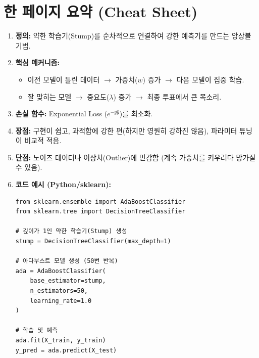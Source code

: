 \documentclass[11pt,a4paper]{book}
\theoremstyle{definition}
\begin{document}
\section{한 페이지 요약 (Cheat Sheet)}

\begin{tcolorbox}[colback=white, colframe=black, title={AdaBoost Quick Review}]
\begin{enumerate}
    \item \textbf{정의:} 약한 학습기(Stump)를 순차적으로 연결하여 강한 예측기를 만드는 앙상블 기법.
    \item \textbf{핵심 메커니즘:}
        \begin{itemize}
            \item 이전 모델이 틀린 데이터 $\rightarrow$ 가중치($w$) 증가 $\rightarrow$ 다음 모델이 집중 학습.
            \item 잘 맞히는 모델 $\rightarrow$ 중요도($\lambda$) 증가 $\rightarrow$ 최종 투표에서 큰 목소리.
        \end{itemize}
    \item \textbf{손실 함수:} Exponential Loss ($e^{-y\hat{y}}$)를 최소화.
    \item \textbf{장점:} 구현이 쉽고, 과적합에 강한 편(하지만 영원히 강하진 않음), 파라미터 튜닝이 비교적 적음.
    \item \textbf{단점:} 노이즈 데이터나 이상치(Outlier)에 민감함 (계속 가중치를 키우려다 망가질 수 있음).
    \item \textbf{코드 예시 (Python/sklearn):}
\begin{lstlisting}[breaklines=true]
from sklearn.ensemble import AdaBoostClassifier
from sklearn.tree import DecisionTreeClassifier

# 깊이가 1인 약한 학습기(Stump) 생성
stump = DecisionTreeClassifier(max_depth=1)

# 아다부스트 모델 생성 (50번 반복)
ada = AdaBoostClassifier(
    base_estimator=stump,
    n_estimators=50,
    learning_rate=1.0
)

# 학습 및 예측
ada.fit(X_train, y_train)
y_pred = ada.predict(X_test)
\end{lstlisting}
\end{enumerate}
\end{tcolorbox}


\end{document}
